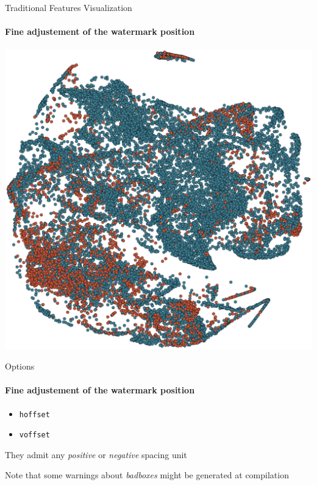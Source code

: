 \documentclass{beamer}
\begin{document}
\begin{frame}{Traditional Features Visualization}
  \framesubtitle{Fine adjustement of the watermark position}

  \begin{center}
    \vspace*{-0.15cm}
  \includegraphics[scale=0.35]{img/trad_feat_viz.eps}
  \end{center}

\end{frame}


\begin{frame}{Options}
  \framesubtitle{Fine adjustement of the watermark position}

  
  \begin{itemize}
    \item \texttt{hoffset}
    \item \texttt{voffset}
  \end{itemize}
  
  They admit any \emph{positive} or \emph{negative} spacing \alert{unit}
  
  Note that some \alert{warnings} about \emph{badboxes} might be generated at compilation

\end{frame}
\end{document}
